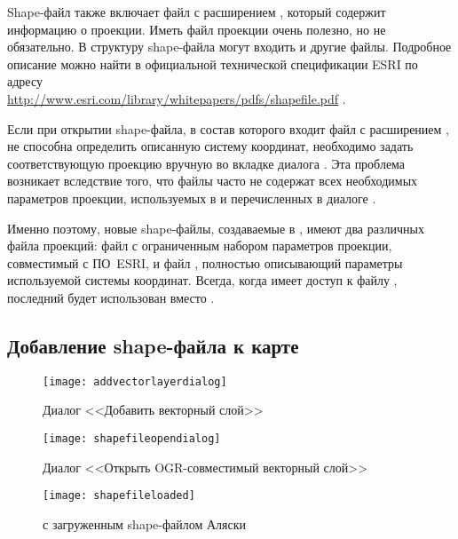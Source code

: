 Shape-файл также включает файл с расширением , который
содержит информацию о проекции. Иметь файл проекции очень полезно, но не
обязательно. В структуру shape-файла могут входить и другие файлы. Подробное
описание можно найти в официальной технической спецификации ESRI по адресу \\
\url{http://www.esri.com/library/whitepapers/pdfs/shapefile.pdf} .


Если при открытии shape-файла, в состав которого входит файл с расширением
, \qg не способна определить описанную систему координат,
необходимо задать соответствующую проекцию вручную во вкладке
 диалога . Эта проблема возникает вследствие
того, что файлы  часто не содержат всех необходимых параметров
проекции, используемых в \qg и перечисленных в диалоге
.

Именно поэтому, новые shape-файлы, создаваемые в \qg, имеют два различных
файла проекций: файл  с ограниченным набором параметров
проекции, совместимый с ПО~ESRI, и файл , полностью описывающий
параметры используемой системы координат. Всегда, когда \qg имеет доступ
к файлу , последний будет использован вместо .

\subsection{Добавление shape-файла к карте}\label{sec:load_shapefile}

\begin{figure}[ht]
   \centering
   \texttt{[image: addvectorlayerdialog]}
   \caption{Диалог <<Добавить векторный слой>> \wincaption}\label{fig:addvectorlayer}
\end{figure}

\begin{figure}[ht]
   \centering
   \texttt{[image: shapefileopendialog]}
   \caption{Диалог <<Открыть OGR-совместимый векторный слой>> \wincaption}\label{fig:openshapefile}
\end{figure}

\begin{figure}[ht]
   \centering
   \texttt{[image: shapefileloaded]}
   \caption{\qg с загруженным shape-файлом Аляски \wincaption}\label{fig:loadedshapefile}
\end{figure}

